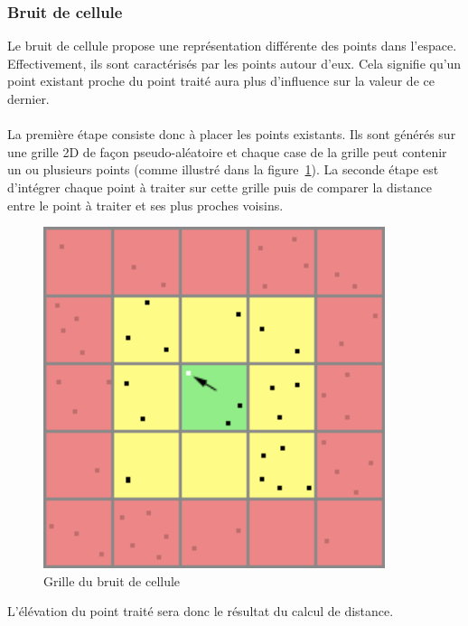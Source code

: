 \subsubsection{Bruit de cellule}
Le bruit de cellule propose une représentation différente des points dans l'espace. Effectivement, ils sont caractérisés par les points autour d'eux.
Cela signifie qu'un point existant proche du point traité aura plus d'influence sur la valeur de ce dernier.
\paragraph{}
La première étape consiste donc à placer les points existants. Ils sont générés sur une grille 2D de façon pseudo-aléatoire et chaque case de la grille peut contenir un ou plusieurs points (comme illustré dans la figure~\ref{fig:cell-noise}).
La seconde étape est d'intégrer chaque point à traiter sur cette grille puis de comparer la distance entre le point à traiter et ses plus proches voisins.

\begin{figure}[ht!]
    \begin{center}
        \includegraphics[width=10cm]{resources/cellgrid.png}
        \caption{Grille du bruit de cellule}
        \label{fig:cell-noise}
    \end{center}
\end{figure}

L'élévation du point traité sera donc le résultat du calcul de distance.
